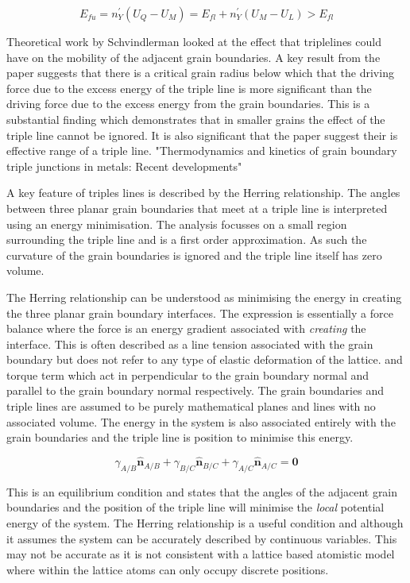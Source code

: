 \documentclass[12pt,a4paper]{book}
\begin{document}
\[E_{fu} =  n_Y^{\prime}(U_Q - U_M) = E_{fl} + n_Y^{\prime}(U_M - U_L) > E_{fl} \]


Theoretical work by Schvindlerman looked at the effect that triplelines could have on the mobility of the adjacent grain boundaries. A key result from the paper suggests that there is a critical grain radius below which that the driving force due to the excess energy of the triple line is more significant than the driving force due to the excess energy from the grain boundaries. This is a substantial finding which demonstrates that in smaller grains the effect of the triple line cannot be ignored. It is also significant that the paper suggest their is effective range of a triple line.  "Thermodynamics and kinetics of grain boundary triple junctions in metals: Recent developments"

A key feature of triples lines is described by the Herring relationship. The angles between three planar grain boundaries that meet at a triple line is interpreted using an energy minimisation. The analysis focusses on a small region surrounding
the triple line and is a first order approximation. As such the curvature of the grain boundaries is ignored and the triple line itself has zero volume.

The Herring relationship can be understood as minimising the energy in creating the three planar grain boundary interfaces. The expression is essentially a force balance where the force is an energy gradient associated with \emph{creating} the interface. This is often described as a line tension associated with the grain boundary but does not refer to any type of elastic deformation of the lattice. and torque term which act in perpendicular to the grain boundary normal and parallel to the grain boundary normal respectively. The grain boundaries and triple lines are assumed to be purely mathematical planes and lines with no associated volume. The energy in the system is also associated entirely with the grain boundaries and the triple line is position to minimise this energy. 

\[\gamma_{A/B}\mathbf{\hat{n}}_{A/B} + \gamma_{B/C}\mathbf{\hat{n}}_{B/C} + \gamma_{A/C}\mathbf{\hat{n}}_{A/C} =\mathbf{0} \]

This is an equilibrium condition and states that the angles of the adjacent grain boundaries and the position of the triple line will minimise the \emph{local} potential energy of the system. The Herring relationship is a useful condition and although it assumes the system can be accurately described by continuous variables. This may not be accurate as it is not consistent with a lattice based atomistic model where within the lattice atoms can only occupy discrete positions.     
\end{document}
